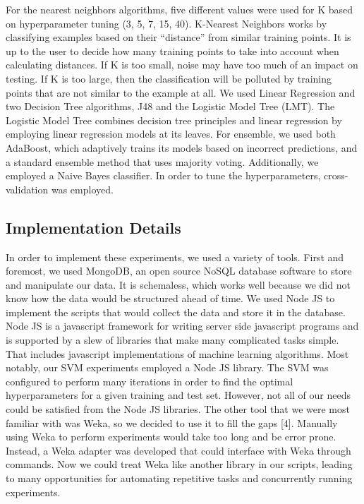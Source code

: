 \documentclass{article}
\newcommand{\quotes}[1]{``#1''}
\begin{document}
For the nearest neighbors algorithms, five different values were used for K based on hyperparameter tuning (3, 5, 7, 15, 40). K-Nearest Neighbors works by classifying examples based on their \quotes{distance} from similar training points. It is up to the user to decide how many training points to take into account when calculating distances. If K is too small, noise may have too much of an impact on testing. If K is too large, then the classification will be polluted by training points that are not similar to the example at all. We used Linear Regression and two Decision Tree algorithms, J48 and the Logistic Model Tree (LMT). The Logistic Model Tree combines decision tree principles and linear regression by employing linear regression models at its leaves. For ensemble, we used both AdaBoost, which adaptively trains its models based on incorrect predictions, and a standard ensemble method that uses majority voting. Additionally, we employed a Naive Bayes classifier. In order to tune the hyperparameters, cross-validation was employed. 

\subsection {Implementation Details}

In order to implement these experiments, we used a variety of tools. First and foremost, we used MongoDB, an open source NoSQL database software to store and manipulate our data. It is schemaless, which works well because we did not know how the data would be structured ahead of time. We used Node JS to implement the scripts that would collect the data and store it in the database. Node JS is a javascript framework for writing server side javascript programs and is supported by a slew of libraries that make many complicated tasks simple. That includes javascript implementations of machine learning algorithms. Most notably, our SVM experiments employed a Node JS library. The SVM was configured to perform many iterations in order to find the optimal hyperparameters for a given training and test set. However, not all of our needs could be satisfied from the Node JS libraries. The other tool that we were most familiar with was Weka, so we decided to use it to fill the gaps [4]. Manually using Weka to perform experiments would take too long and be error prone. Instead, a Weka adapter was developed that could interface with Weka through commands. Now we could treat Weka like another library in our scripts, leading to many opportunities for automating repetitive tasks and concurrently running experiments. 
\end{document}
